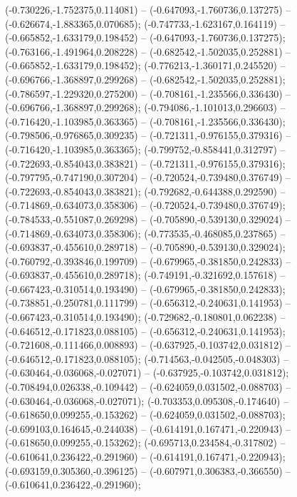  (-0.730226,-1.752375,0.114081) -- (-0.647093,-1.760736,0.137275) -- (-0.626674,-1.883365,0.070685);
 (-0.747733,-1.623167,0.164119) -- (-0.665852,-1.633179,0.198452) -- (-0.647093,-1.760736,0.137275);
 (-0.763166,-1.491964,0.208228) -- (-0.682542,-1.502035,0.252881) -- (-0.665852,-1.633179,0.198452);
 (-0.776213,-1.360171,0.245520) -- (-0.696766,-1.368897,0.299268) -- (-0.682542,-1.502035,0.252881);
 (-0.786597,-1.229320,0.275200) -- (-0.708161,-1.235566,0.336430) -- (-0.696766,-1.368897,0.299268);
 (-0.794086,-1.101013,0.296603) -- (-0.716420,-1.103985,0.363365) -- (-0.708161,-1.235566,0.336430);
 (-0.798506,-0.976865,0.309235) -- (-0.721311,-0.976155,0.379316) -- (-0.716420,-1.103985,0.363365);
 (-0.799752,-0.858441,0.312797) -- (-0.722693,-0.854043,0.383821) -- (-0.721311,-0.976155,0.379316);
 (-0.797795,-0.747190,0.307204) -- (-0.720524,-0.739480,0.376749) -- (-0.722693,-0.854043,0.383821);
 (-0.792682,-0.644388,0.292590) -- (-0.714869,-0.634073,0.358306) -- (-0.720524,-0.739480,0.376749);
 (-0.784533,-0.551087,0.269298) -- (-0.705890,-0.539130,0.329024) -- (-0.714869,-0.634073,0.358306);
 (-0.773535,-0.468085,0.237865) -- (-0.693837,-0.455610,0.289718) -- (-0.705890,-0.539130,0.329024);
 (-0.760792,-0.393846,0.199709) -- (-0.679965,-0.381850,0.242833) -- (-0.693837,-0.455610,0.289718);
 (-0.749191,-0.321692,0.157618) -- (-0.667423,-0.310514,0.193490) -- (-0.679965,-0.381850,0.242833);
 (-0.738851,-0.250781,0.111799) -- (-0.656312,-0.240631,0.141953) -- (-0.667423,-0.310514,0.193490);
 (-0.729682,-0.180801,0.062238) -- (-0.646512,-0.171823,0.088105) -- (-0.656312,-0.240631,0.141953);
 (-0.721608,-0.111466,0.008893) -- (-0.637925,-0.103742,0.031812) -- (-0.646512,-0.171823,0.088105);
 (-0.714563,-0.042505,-0.048303) -- (-0.630464,-0.036068,-0.027071) -- (-0.637925,-0.103742,0.031812);
 (-0.708494,0.026338,-0.109442) -- (-0.624059,0.031502,-0.088703) -- (-0.630464,-0.036068,-0.027071);
 (-0.703353,0.095308,-0.174640) -- (-0.618650,0.099255,-0.153262) -- (-0.624059,0.031502,-0.088703);
 (-0.699103,0.164645,-0.244038) -- (-0.614191,0.167471,-0.220943) -- (-0.618650,0.099255,-0.153262);
 (-0.695713,0.234584,-0.317802) -- (-0.610641,0.236422,-0.291960) -- (-0.614191,0.167471,-0.220943);
 (-0.693159,0.305360,-0.396125) -- (-0.607971,0.306383,-0.366550) -- (-0.610641,0.236422,-0.291960);
